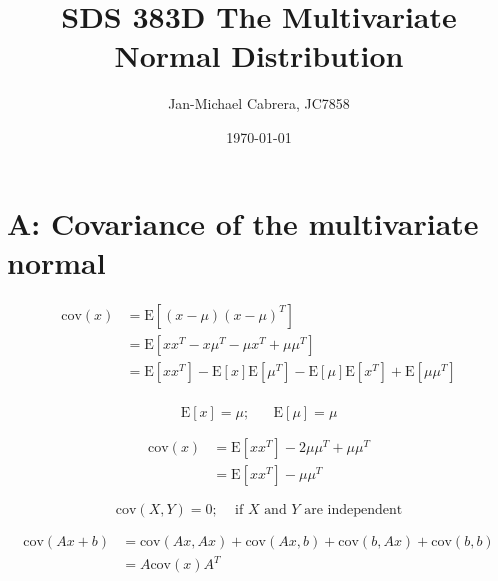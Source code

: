 \documentclass[12pt]{article}
\newcommand{\cov}{\text{cov}}
\begin{document}
    \title{SDS 383D The Multivariate Normal Distribution}
    \author{Jan-Michael Cabrera, JC7858}
    \date{\today}
    \maketitle

    \section*{A: Covariance of the multivariate normal}

        \begin{align}
            \cov(x) &= \text{E}[(x-\mu)(x-\mu)^T ] \\
            &= \text{E}[xx^T -x \mu^T - \mu x^T + \mu \mu^T]\\
            &= \text{E}[xx^T] - \text{E}[x] \text{E}[\mu^T] - \text{E}[\mu]\text{E}[x^T] + \text{E}[\mu \mu^T]\\
        \end{align}

        \begin{equation}
            \text{E}[x] = \mu; \hspace{20pt} \text{E}[\mu] = \mu
        \end{equation}

        \begin{align}
            \cov(x) &= \text{E}[xx^T] - 2\mu \mu^T + \mu\mu^T\\
            &= \text{E}[xx^T] - \mu\mu^T
        \end{align}

        \begin{equation}
            \cov(X, Y) = 0; \hspace{10pt} \text{ if $X$ and $Y$ are independent}
        \end{equation}

        \begin{align}
            \cov(Ax + b) &= \cov(Ax, Ax) + \cov(Ax, b) + \cov(b, Ax) + \cov(b,b) \\
            & = A \cov(x) A^T
        \end{align}
\end{document}
